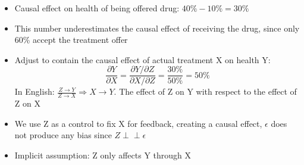 \documentclass[10pt, oneside]{article}
\newcommand{\ind}{\perp\!\!\!\!\perp}
\begin{document}
\begin{itemize}
\begin{itemize}
\begin{tabular}{|c|c|c|}
            \hline
        \end{tabular}
        \item Causal effect on health of being offered drug: $40\%-10\% = 30\%$
        \item This number underestimates the causal effect of receiving the drug, since only 60\% accept the treatment offer
        \item Adjust to contain the     causal effect of actual treatment X on health Y:
        \[\frac{\partial Y}{\partial X} = \frac{\partial Y/\partial Z}{\partial X/\partial Z} = \frac{30\%}{50\%} = 50\%\]
        In English: $\frac{Z\rightarrow Y}{Z \rightarrow X} \Rightarrow X\rightarrow Y$. The effect of Z on Y with respect to the effect of Z on X
        \item We use Z as a control to fix X for feedback, creating a causal effect, $\epsilon$ does not produce any bias since $Z\ind \epsilon$
        \item Implicit assumption: Z only affects Y through X
    \end{itemize}

\end{itemize}
\end{document}
